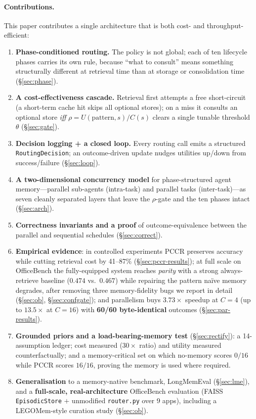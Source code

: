 \documentclass[10pt,twocolumn]{article}
\newcommand{\code}[1]{\texttt{\small #1}}
\begin{document}
\paragraph{Contributions.} This paper contributes a single architecture that is
both cost- and throughput-efficient:
\begin{enumerate}\itemsep1pt
\item \textbf{Phase-conditioned routing.} The policy is not global; each of ten
lifecycle phases carries its own rule, because ``what to consult'' means something
structurally different at retrieval time than at storage or consolidation time
(\S\ref{sec:phase}).
\item \textbf{A cost-effectiveness cascade.} Retrieval first attempts a free
short-circuit (a short-term cache hit skips all optional stores); on a miss it
consults an optional store \emph{iff} $\rho=U(\text{pattern},s)/C(s)$ clears a
single tunable threshold $\theta$ (\S\ref{sec:gate}).
\item \textbf{Decision logging + a closed loop.} Every routing call emits a
structured \code{RoutingDecision}; an outcome-driven update nudges utilities
up/down from success/failure (\S\ref{sec:loop}).
\item \textbf{A two-dimensional concurrency model} for phase-structured agent
memory---parallel sub-agents (intra-task) and parallel tasks (inter-task)---as
seven cleanly separated layers that leave the $\rho$-gate and the ten phases
intact (\S\ref{sec:arch}).
\item \textbf{Correctness invariants and a proof} of outcome-equivalence between
the parallel and sequential schedules (\S\ref{sec:correct}).
\item \textbf{Empirical evidence}: in controlled experiments PCCR preserves accuracy
while cutting retrieval cost by 41--87\% (\S\ref{sec:pccr-results}); at full scale on
OfficeBench the fully-equipped system reaches \emph{parity} with a strong always-retrieve
baseline ($0.474$ vs.\ $0.467$) while repairing the pattern na\"ive memory degrades, after
removing three memory-fidelity bugs we report in detail (\S\ref{sec:ob}, \S\ref{sec:confgate});
and parallelism
buys $3.73\times$ speedup at $C{=}4$ (up to $13.5\times$ at $C{=}16$) with
\textbf{60/60 byte-identical} outcomes (\S\ref{sec:par-results}).
\item \textbf{Grounded priors and a load-bearing-memory test} (\S\ref{sec:rectify}):
a 14-assumption ledger; cost measured ($30\times$ ratio) and utility measured
counterfactually; and a memory-critical set on which no-memory scores $0/16$ while
PCCR scores $16/16$, proving the memory is used where required.
\item \textbf{Generalisation} to a memory-native benchmark, LongMemEval
(\S\ref{sec:lme}), and a \textbf{full-scale, real-architecture} OfficeBench
evaluation (FAISS \code{EpisodicStore} $+$ unmodified \code{router.py} over 9 apps),
including a LEGOMem-style curation study (\S\ref{sec:ob}).
\end{enumerate}
\end{document}
